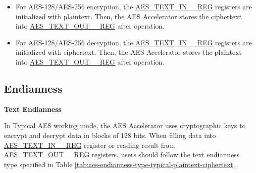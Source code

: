 \documentclass[main\_\_EN.tex]{subfiles}
\begin{document}
\begin{itemize}
    \item For AES-128/AES-256 encryption, the \hyperref[regdesc:AESTEXTINnREG]{AES\_TEXT\_IN\_\_REG} registers are initialized with plaintext. Then, the AES Accelerator stores the ciphertext into \hyperref[regdesc:AESTEXTOUTnREG]{AES\_TEXT\_OUT\_\_REG} after operation.
    \item For AES-128/AES-256 decryption, the \hyperref[regdesc:AESTEXTINnREG]{AES\_TEXT\_IN\_\_REG} registers are initialized with ciphertext. Then, the AES Accelerator stores the plaintext into \hyperref[regdesc:AESTEXTOUTnREG]{AES\_TEXT\_OUT\_\_REG} after operation.
\end{itemize}


\subsection{Endianness}

\textbf{Text Endianness}

In Typical AES working mode, the AES Accelerator uses cryptographic keys to encrypt and decrypt data in blocks of 128 bits.
When filling data into \hyperref[regdesc:AESTEXTINnREG]{AES\_TEXT\_IN\_\_REG} register or reading result from \hyperref[regdesc:AESTEXTINnREG]{AES\_TEXT\_OUT\_\_REG} registers, users should follow the text endianness type specified in Table \ref{tab:aes-endianness-type-typical-plaintext-ciphertext}.
\end{document}
